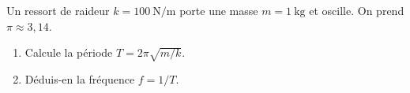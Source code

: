 \documentclass[11pt,a4paper]{article}
\begin{document}
\begin{exo}
Un ressort de raideur $k=\qty{100}{\newton\per\metre}$ porte une masse $m=\qty{1}{\kilogram}$ et
oscille. On prend $\pi\approx3,14$.
\begin{enumerate}[label=\alph*)]
  \item Calcule la période $T=2\pi\sqrt{m/k}$.
  \item Déduis-en la fréquence $f=1/T$.
\end{enumerate}
\end{exo}
\end{document}
